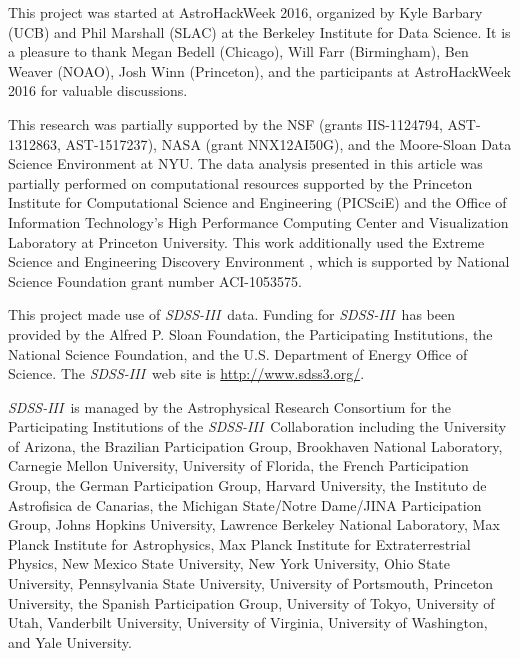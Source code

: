 \documentclass[manuscript, letterpaper]{aastex6}
\newcommand{\project}[1]{\textsl{#1}}
\newcommand{\acronym}[1]{{\small{#1}}}
\newcommand{\apogee}{\project{\acronym{APOGEE}}}
\newcommand{\sdssiii}{\project{\acronym{SDSS-III}}}
\begin{document}
\acknowledgements
This project was started at AstroHackWeek 2016, organized by Kyle
Barbary (UCB) and Phil Marshall (SLAC) at the Berkeley Institute for
Data Science.
It is a pleasure to thank
  Megan Bedell (Chicago),
  Will Farr (Birmingham),
  Ben Weaver (NOAO),
  Josh Winn (Princeton),
  and the participants at AstroHackWeek 2016
for valuable discussions.

This research was partially supported by
  the \acronym{NSF} (grants \acronym{IIS-1124794}, \acronym{AST-1312863}, \acronym{AST-1517237}),
  \acronym{NASA} (grant \acronym{NNX12AI50G}),
  and the Moore-Sloan Data Science Environment at \acronym{NYU}.
The data analysis presented in this article was partially performed on
computational resources supported by the Princeton Institute for Computational
Science and Engineering (PICSciE) and the Office of Information Technology's
High Performance Computing Center and Visualization Laboratory at Princeton
University.
This work additionally used the Extreme Science and Engineering Discovery
Environment \citep[XSEDE;][]{Towns:2014}, which is supported by National
Science Foundation grant number ACI-1053575.

This project made use of \sdssiii\ data. Funding for \sdssiii\ has been
provided by the Alfred P. Sloan Foundation, the Participating Institutions, the
National Science Foundation, and the \acronym{U.S.} Department of Energy Office
of Science. The \sdssiii\ web site is \url{http://www.sdss3.org/}.

\sdssiii\ is managed by the Astrophysical Research Consortium for the
Participating Institutions of the \sdssiii\ Collaboration including the
University of Arizona, the Brazilian Participation Group, Brookhaven National
Laboratory, Carnegie Mellon University, University of Florida, the French
Participation Group, the German Participation Group, Harvard University, the
Instituto de Astrofisica de Canarias, the Michigan State/Notre
Dame/\acronym{JINA} Participation Group, Johns Hopkins University, Lawrence
Berkeley National Laboratory, Max Planck Institute for Astrophysics, Max Planck
Institute for Extraterrestrial Physics, New Mexico State University, New York
University, Ohio State University, Pennsylvania State University, University of
Portsmouth, Princeton University, the Spanish Participation Group, University
of Tokyo, University of Utah, Vanderbilt University, University of Virginia,
University of Washington, and Yale University.


\facility{\sdssiii, \apogee}



\end{document}
